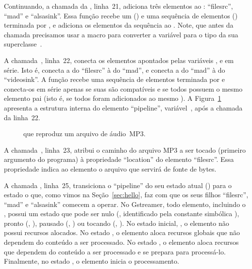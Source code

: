 \documentclass{SBCbookchapter}
\begin{document}
Continuando, a chamada da , linha~21, adiciona três elementos 
ao : ``filesrc'', ``mad'' e ``alsasink''.  Essa função recebe um
 () e uma sequência de elementos () terminada
por , e adiciona os elementos da sequência ao .  Note, que antes
da chamada precisamos usar a macro  para converter a variável
 para o tipo da sua superclasse~.

A chamada~, linha~22, conecta os elementos
apontados pelas variáveis ,  e  em série.  Isto é,
conecta a  do ``filesrc'' à  do ``mad'', e
conecta a  do ``mad'' à  do ``videosink''.
A função  recebe uma sequência de elementos
terminada por  e conecta-os em série apenas se suas  são
compatíveis e se todos possuem o mesmo elemento pai (isto é, se todos
foram adicionados ao mesmo ).  A Figura~\ref{fig:pipe-mp3} apresenta a
estrutura interna do elemento ``pipeline'', variável~, após a
chamada da linha~22.

\begin{figure}[t]
  \centering
  \caption{ que reproduz um arquivo de áudio~MP3.}
  \label{fig:pipe-mp3}
\end{figure}

A chamada~, linha~23, atribui o caminho do arquivo MP3 a ser
tocado (primeiro argumento do programa) à propriedade ``location'' do
elemento ``filesrc''.  Essa propriedade indica ao elemento o arquivo que
servirá de fonte de bytes.

A chamada , linha~25, transiciona o ``pipeline'' do
seu estado atual () para o estado  o que, como vimos na
Seção~\ref{sec:hello}, faz com que os seus filhos ``filesrc'', ``mad'' e
``alsasink'' comecem a operar.  No Gstreamer, todo elemento, incluindo o
, possui um estado que pode ser nulo (, identificado
pela constante simbólica ), pronto (,
), pausado (, ) ou tocando
(, ).  No estado inicial, , o
elemento não possui recursos alocados.  No estado , o elemento
aloca recursos globais que não dependem do conteúdo a ser processado.  No
estado , o elemento aloca recursos que dependem do conteúdo a ser
processado e se prepara para processá-lo.  Finalmente, no estado
, o elemento inicia o processamento.
\end{document}
